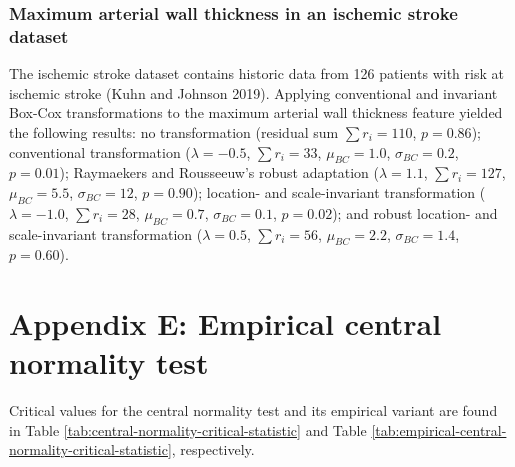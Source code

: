 \documentclass[
  a4paper,
]{article}
\begin{document}
\subsubsection{Maximum arterial wall thickness in an ischemic stroke
dataset}\label{maximum-arterial-wall-thickness-in-an-ischemic-stroke-dataset}

The ischemic stroke dataset contains historic data from 126 patients
with risk at ischemic stroke (Kuhn and Johnson 2019). Applying
conventional and invariant Box-Cox transformations to the maximum
arterial wall thickness feature yielded the following results: no
transformation (residual sum \(\sum r_i = 110\), \(p=0.86\));
conventional transformation (\(\lambda = -0.5\), \(\sum r_i = 33\),
\(\mu_{BC} = 1.0\), \(\sigma_{BC} = 0.2\), \(p=0.01\)); Raymaekers and
Rousseeuw's robust adaptation (\(\lambda = 1.1\), \(\sum r_i = 127\),
\(\mu_{BC} = 5.5\), \(\sigma_{BC} = 12\), \(p=0.90\)); location- and
scale-invariant transformation (\(\lambda = -1.0\), \(\sum r_i = 28\),
\(\mu_{BC} = 0.7\), \(\sigma_{BC} = 0.1\), \(p=0.02\)); and robust
location- and scale-invariant transformation (\(\lambda = 0.5\),
\(\sum r_i = 56\), \(\mu_{BC} = 2.2\), \(\sigma_{BC} = 1.4\),
\(p=0.60\)).

\section{Appendix E: Empirical central normality
test}\label{appendix-e-empirical-central-normality-test}

Critical values for the central normality test and its empirical variant
are found in Table \ref{tab:central-normality-critical-statistic} and
Table \ref{tab:empirical-central-normality-critical-statistic},
respectively.
\end{document}
